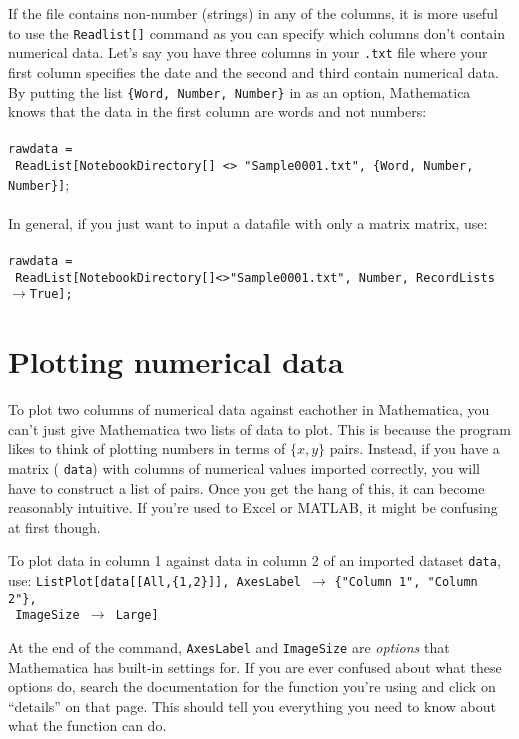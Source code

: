 \begin{exercise}
\begin{example}
If the file contains non-number (strings) in any of the columns, it is more useful to use the \texttt{Readlist[]} command as you can specify which columns don't contain numerical data. Let's say you have three columns in your \texttt{.txt} file where your first column specifies the date and the second and third  contain numerical data. By putting the list \texttt{\{Word, Number, Number\}} in as an option, Mathematica knows that the data in the first column are words and not numbers: \\
\\
\texttt{rawdata = }\\\texttt{  ReadList[NotebookDirectory[] <> "Sample0001.txt", \{Word, Number, Number\}]};\\
\\
In general, if you just want to input a datafile with only a matrix matrix, use:\\
\\
\texttt{rawdata =} \\ \texttt{ ReadList[NotebookDirectory[]<>"Sample0001.txt",  Number, }\texttt{RecordLists}$\to$\texttt{True];}
\end{example}
\label{UTuploadingdata}
\end{exercise}

\section{Plotting numerical data}

To plot two columns of numerical data against eachother in Mathematica, you can't just give Mathematica two lists of data to plot. This is because the program likes to think of plotting numbers in terms of $\{x,y\}$ pairs. Instead, if you have a matrix ( \texttt{data}) with columns of numerical values imported correctly, you will have to construct a list of pairs. Once you get the hang of this, it can become reasonably intuitive. If you're used to Excel or MATLAB, it might be confusing at first though.

\begin{example}
To plot data in column 1  against data in column 2 of an imported dataset \texttt{data}, use: \texttt{ListPlot[data[[All,\{1,2\}]], AxesLabel }$\to$ \texttt{\{"Column 1", "Column 2"\},}\\ \texttt{
 ImageSize $\to$ Large]}\\

\end{example}
At the end of the command, \texttt{AxesLabel} and \texttt{ImageSize} are {\it options} that Mathematica has built-in settings for. If you are ever confused about what these options do, search the documentation for the function you're using and click on ``details'' on that page. This should tell you everything you need to know about what the function can do.  


